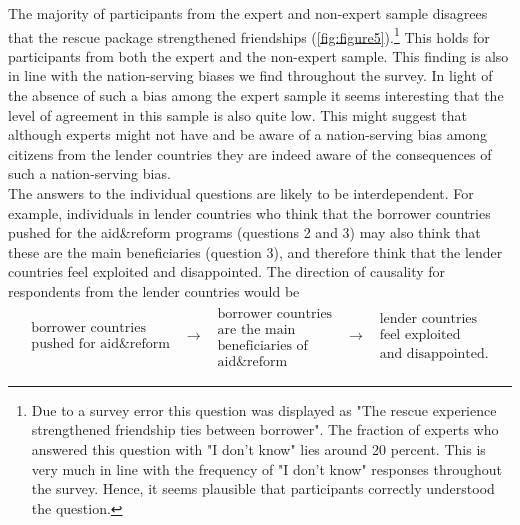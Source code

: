The majority of participants from the expert and non-expert sample disagrees that 
the rescue package strengthened friendships (\autoref{fig:figure5}).\footnote{Due to a survey error this question was displayed as "The rescue experience strengthened friendship ties between borrower". The fraction of experts who answered this question with "I don't know" lies around 20 percent. This is very much in line with the frequency of "I don't know" responses throughout the survey. Hence, it seems plausible that participants correctly understood the question. } This holds for participants from 
both the expert and the non-expert sample. This finding is also in line with the nation-serving biases
we find throughout the survey. In light of the absence of such a bias among the expert sample 
it seems interesting that the level of agreement in this sample is also quite low. 
This might suggest that although experts might not have and be aware of a nation-serving bias
among citizens from the lender countries they are indeed aware of the consequences of such 
a nation-serving bias. 
\\

The answers to the individual questions are likely to
be interdependent. For example, individuals in lender countries who
think that the borrower countries pushed for the aid\&reform programs
(questions 2 and 3) may also think that these are the main beneficiaries
(question 3), and therefore think that the lender countries feel exploited
and disappointed. The direction of causality for respondents from the lender
countries would be%
\begin{equation*}
\begin{array}{ccccc}
\begin{array}{c}
\text{borrower countries} \\ 
\text{pushed for aid\&reform}%
\end{array}
& \rightarrow  & 
\begin{array}{c}
\text{borrower countries} \\ 
\text{are the main} \\ 
\text{beneficiaries of} \\ 
\text{aid\&reform}%
\end{array}
& \rightarrow  & 
\begin{array}{c}
\text{lender countries} \\ 
\text{feel exploited} \\ 
\text{and disappointed.}%
\end{array}%
\end{array}%
\end{equation*}


